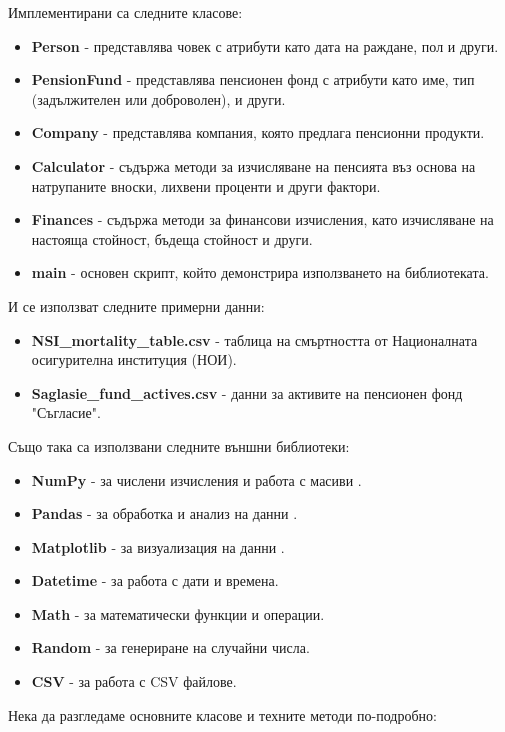 \documentclass[a4paper,12pt]{article}
\begin{document}
Имплементирани са следните класове:
\begin{itemize}
        \item \textbf{Person} - представлява човек с атрибути като дата на раждане, пол и други.
        \item \textbf{PensionFund} - представлява пенсионен фонд с атрибути като име, тип (задължителен или доброволен), и други.
        \item \textbf{Company} - представлява компания, която предлага пенсионни продукти.
        \item \textbf{Calculator} - съдържа методи за изчисляване на пенсията въз основа на натрупаните вноски, лихвени проценти и други фактори.
        \item \textbf{Finances} - съдържа методи за финансови изчисления, като изчисляване на настояща стойност, бъдеща стойност и други.
        \item \textbf{main} - основен скрипт, който демонстрира използването на библиотеката.
\end{itemize}
И се използват следните примерни данни:
\begin{itemize}
        \item \textbf{NSI\_mortality\_table.csv} - таблица на смъртността от Националната осигурителна институция (НОИ).
        \item \textbf{Saglasie\_fund\_actives.csv} - данни за активите на пенсионен фонд "Съгласие".
\end{itemize}
Също така са използвани следните външни библиотеки:
\begin{itemize}
        \item \textbf{NumPy} - за числени изчисления и работа с масиви \cite{numpy2024}.
        \item \textbf{Pandas} - за обработка и анализ на данни \cite{pandas2024}.
        \item \textbf{Matplotlib} - за визуализация на данни \cite{matplotlib2024}.
        \item \textbf{Datetime} - за работа с дати и времена.
        \item \textbf{Math} - за математически функции и операции.
        \item \textbf{Random} - за генериране на случайни числа.
        \item \textbf{CSV} - за работа с CSV файлове.
\end{itemize}
Нека да разгледаме основните класове и техните методи по-подробно:
\end{document}
